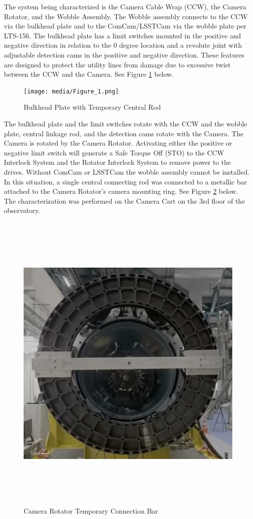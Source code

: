 \documentclass[SE,lsstdraft,authoryear,toc]{lsstdoc}
\begin{document}
The system being characterized is the Camera Cable Wrap (CCW), the
Camera Rotator, and the Wobble Assembly. The Wobble assembly connects to
the CCW via the bulkhead plate and to the ComCam/LSSTCam via the wobble
plate per LTS-156. The bulkhead plate has a limit switches mounted in
the positive and negative direction in relation to the 0 degree location
and a revolute joint with adjustable detection cams in the positive and
negative direction. These features are designed to protect the utility
lines from damage due to excessive twist between the CCW and the Camera.
See Figure \ref{fig:Figure_1} below.

\begin{figure}[h!]
  \texttt{[image: media/Figure\_1.png]}
  \caption{Bulkhead Plate with Temporary Central Rod}
  \label{fig:Figure_1}
\end{figure}

The bulkhead plate and the limit switches rotate
with the CCW and the wobble plate, central linkage rod, and the
detection cams rotate with the Camera. The Camera is rotated by the
Camera Rotator. Activating either the positive or negative limit switch
will generate a Safe Torque Off (STO) to the CCW Interlock System and
the Rotator Interlock System to remove power to the drives. Without
ComCam or LSSTCam the wobble assembly cannot be installed. In this
situation, a single central connecting rod was connected to a metallic
bar attached to the Camera Rotator's camera mounting ring. See Figure \ref{fig:Figure_2}
below. The characterization was performed on the Camera Cart on the 3rd
floor of the observatory.

\begin{figure}[h!]
  \includegraphics[width=6.5in,height=5.96389in]{media/Figure_2.png}
  \caption{Camera Rotator Temporary Connection Bar}
  \label{fig:Figure_2}
\end{figure}
\end{document}
